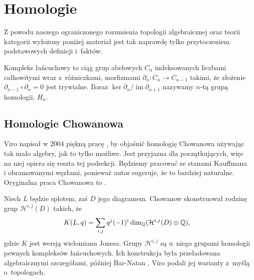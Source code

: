 \section{Homologie}


Z powodu naszego ograniczonego rozumienia topologii algebraicznej oraz teorii kategorii wyłożony poniżej materiał jest tak naprawdę tylko przytoczeniem podstawowych definicji i~faktów.

Kompleks łańcuchowy to ciąg grup abelowych $C_n$ indeksowanych liczbami całkowitymi
wraz z~różniczkami, morfizmami $\partial_n \colon C_n \to C_{n-1}$ takimi,
że złożenie $\partial_{n-1} \circ \partial_n = 0$ jest trywialne.
Iloraz $\ker \partial_n / \operatorname{im} \partial_{n+1}$ nazywamy $n$-tą grupą homologii, $H_n$.

\subsection{Homologie Chowanowa}
Viro napisał w 2004 piękną pracę \cite{viro04}, by objaśnić homologię Chowanowa używając tak mało algebry, jak to tylko możliwe.
Jest przyjazna dla początkujących, więc na niej opiera się reszta tej podsekcji.
Będziemy pracować ze stanami Kauffmana i obramowanymi węzłami, ponieważ autor sugeruje, że to bardziej naturalne.
Oryginalna praca Chowanowa to \cite{khovanov00}.

Niech $L$ będzie splotem, zaś $D$ jego diagramem.
Chowanow skonstruował rodzinę grup $\mathcal H^{i, j}(D)$ takich, że
\begin{equation}
    K(L, q) = \sum_{i, j} q^j (-1)^i \dim_\mathbb Q (\mathcal H^{i, j}(D) \otimes \mathbb Q),
\end{equation}
gdzie $K$ jest wersją wielomianu Jonesa.
Grupy $\mathcal H^{i, j}$ są u~niego grupami homologii pewnych kompleksów łańcuchowych.
Ich konstrukcja była przeładowana algebraicznymi szczegółami, później Bar-Natan \cite{barnatan02}, Viro podali jej warianty z~myślą o~topologach.



